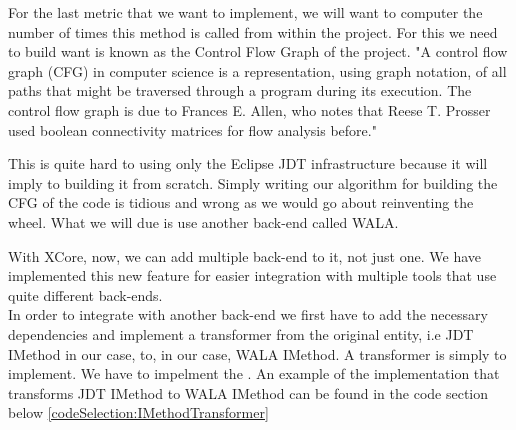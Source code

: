         For the last metric that we want to implement, we will want to computer the number of times this method is called from within the project. For this we need to build want is known
as the Control Flow Graph of the project. "A control flow graph (CFG) in computer science is a representation, using graph notation, of all paths that might be traversed through a program during its execution. The control flow graph is due to Frances E. Allen, who notes that Reese T. Prosser used boolean connectivity matrices for flow analysis before." \cite{wiki:CFG}

        This is quite hard to using only the Eclipse JDT infrastructure because it will imply to building it from scratch. Simply writing our algorithm for building the CFG of the code is tidious and wrong as we would go about reinventing the wheel. 
What we will due is use another back-end called WALA. 
        
        With XCore, now, we can add multiple back-end to it, not just one. We have implemented this new feature for easier integration with multiple tools that use quite different back-ends. \\
        In order to integrate with another back-end we first have to add the necessary dependencies and implement a transformer from the original entity, i.e JDT IMethod in our case, to, in our case, WALA IMethod.
A transformer is simply to implement. We have to impelment the . An example of the implementation that transforms JDT IMethod to WALA IMethod can be found in the code section below
\ref{codeSelection:IMethodTransformer}

